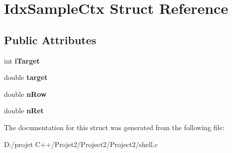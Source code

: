 \hypertarget{struct_idx_sample_ctx}{}\section{Idx\+Sample\+Ctx Struct Reference}
\label{struct_idx_sample_ctx}
\subsection*{Public Attributes}
\begin{DoxyCompactItemize}
\item 
\mbox{\label{struct_idx_sample_ctx_a1c693a5457d8bf218a24472676a0cc5e}} 
int {\bfseries i\+Target}
\item 
\mbox{\label{struct_idx_sample_ctx_a4791be27676f101f9c457325ebddd4a5}} 
double {\bfseries target}
\item 
\mbox{\label{struct_idx_sample_ctx_a5b69901a5bc7838f36b272944e940a8f}} 
double {\bfseries n\+Row}
\item 
\mbox{\label{struct_idx_sample_ctx_abaae5b2ae882a4f62bf3a3c69fbccb42}} 
double {\bfseries n\+Ret}
\end{DoxyCompactItemize}


The documentation for this struct was generated from the following file\+:\begin{DoxyCompactItemize}
\item 
D\+:/projet C++/\+Projet2/\+Project2/\+Project2/shell.\+c\end{DoxyCompactItemize}
